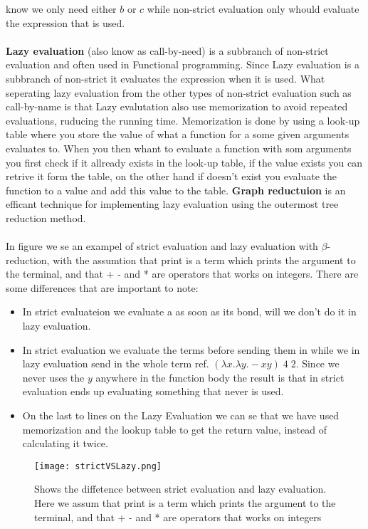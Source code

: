 know we only need either $b$ or $c$ while non-strict evaluation only whould evaluate the expression that is used.
\\ \\
\textbf{Lazy evaluation} (also know as call-by-need) is a subbranch 
of non-strict evaluation and often used in Functional programming. Since Lazy evaluation is a subbranch of non-strict it evaluates 
the expression when it is used. What seperating lazy evaluation from the other types of non-strict evaluation such as call-by-name
is that Lazy evalutation also use memorization to avoid repeated evaluations, ruducing the running time. Memorization is done by using a 
look-up table where you store the value of what a function for a some given arguments evaluates to. When you then whant to evaluate a 
function with som arguments you first check if it allready exists in the look-up table, if the value exists you can retrive it form the table, on the 
other hand if doesn't exist you evaluate the function to a value and add this value to the table.
\textbf{Graph reductuion} is an efficant technique for implementing lazy evaluation using the outermost tree reduction method.
\\ \\
In figure  we se an exampel of strict evaluation and lazy evaluation with $\beta$-reduction, with the 
assumtion that print is a term which prints the argument to the terminal, and that + - and * are operators that works on integers.
There are some differences that are important to note:

\begin{itemize}
    \item In strict evaluateion we evaluate a as soon as its bond, will we don't do it in lazy evaluation.
    \item In strict evaluation we evaluate the terms before sending them in while we in lazy evaluation send in the whole term
    ref. $(\lambda x.\lambda y. - x y)\; 4 \; 2$. Since we never uses the $y$ anywhere in the function body the result is that 
    in strict evaluation ends up evaluating something that never is used.
    \item On the last to lines on the Lazy Evaluation we can se that we have used memorization and the lookup table to get
    the return value, instead of calculating it twice.
\end{itemize}

\begin{figure}
    \centering
    \texttt{[image: strictVSLazy.png]}
    \caption{Shows the diffetence between strict evaluation and lazy evaluation. Here we assum that print is a term which 
    prints the argument to the terminal, and that + - and * are operators that works on integers}
    \label{fig:strictVSLazy}
\end{figure}